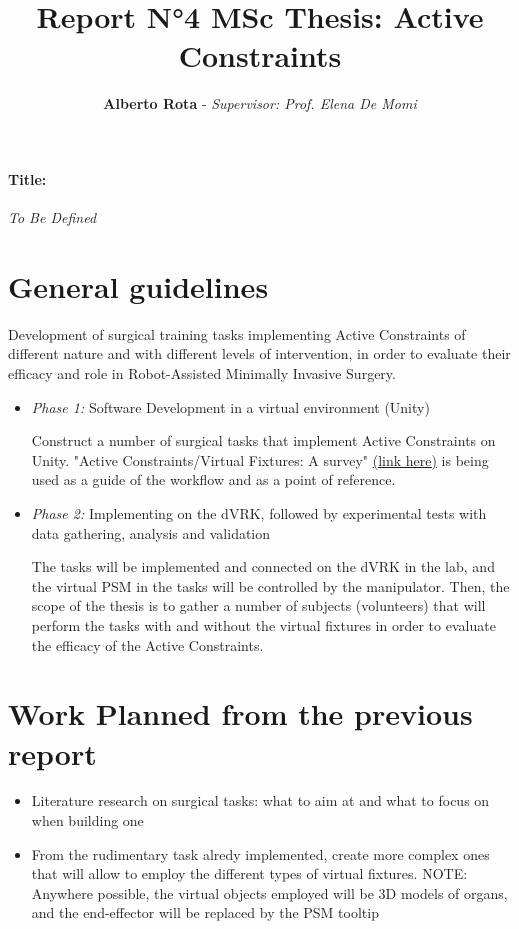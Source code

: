 \documentclass{article}
\title{\textbf{Report N°4 MSc Thesis: Active Constraints}}
\author{\textbf{Alberto Rota} - \textit{Supervisor: Prof. Elena De Momi}}
\date{}
\begin{document}
\maketitle
\paragraph{Title:} \textit{To Be Defined}
\section*{General guidelines}
    Development of surgical training tasks implementing Active Constraints of
    different nature and with different levels of intervention, in order to
    evaluate their efficacy and role in Robot-Assisted Minimally Invasive Surgery.
    \begin{itemize}
        \item \textit{Phase 1: }Software Development in a virtual environment (Unity)
        
        Construct a number of surgical tasks that implement Active Constraints on Unity. "Active
        Constraints/Virtual Fixtures: A survey"
        \href{https://ieeexplore.ieee.org/document/6634270}{(link here)} is being used as a guide of the workflow and as a point of reference.
        \item \textit{Phase 2: }Implementing on the dVRK, followed by
        experimental tests with data gathering, analysis and validation
        
        The tasks will be implemented and connected on the dVRK in the lab, and the virtual PSM in the tasks will be controlled by the manipulator. Then, the scope of the thesis is to gather a number of subjects (volunteers) that will perform the tasks with and without the virtual fixtures in order to evaluate the efficacy of the Active Constraints. 
    \end{itemize}

\section*{Work Planned from the previous report}
\begin{itemize}
    \item Literature research on surgical tasks: what to aim at and what to
    focus on when building one
    \item From the rudimentary task alredy implemented, create more complex
    ones that will allow to employ the different types of virtual fixtures.
    \newline NOTE: Anywhere possible, the virtual objects employed will be 3D models
    of organs, and the end-effector will be replaced by the PSM tooltip
\end{itemize}
\end{document}
